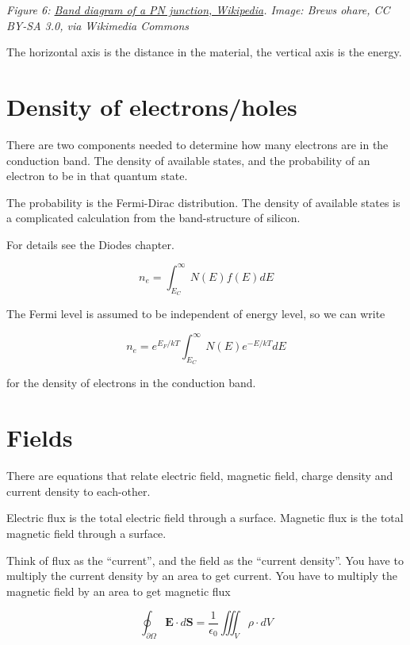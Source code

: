 {
\centering
{}
}

\emph{Figure 6: \href{https://en.wikipedia.org/wiki/Band_diagram}{Band
diagram of a PN junction, Wikipedia}. Image: Brews ohare, CC BY-SA 3.0,
via Wikimedia Commons}

The horizontal axis is the distance in the material, the vertical axis
is the energy.

\section{Density of electrons/holes}\label{density-of-electronsholes}

There are two components needed to determine how many electrons are in
the conduction band. The density of available states, and the
probability of an electron to be in that quantum state.

The probability is the Fermi-Dirac distribution. The density of
available states is a complicated calculation from the band-structure of
silicon.

For details see the Diodes chapter.

\[ n_e = \int_{E_C}^{\infty} N(E)f(E) dE\]

The Fermi level is assumed to be independent of energy level, so we can
write

\[ n_e = e^{E_F/kT}  \int_{E_C}^{\infty} N(E) e^{-E/kT}dE\]

for the density of electrons in the conduction band.

\section{Fields}\label{fields}

There are equations that relate electric field, magnetic field, charge
density and current density to each-other.

Electric flux is the total electric field through a surface. Magnetic
flux is the total magnetic field through a surface.

Think of flux as the ``current'', and the field as the ``current
density''. You have to multiply the current density by an area to get
current. You have to multiply the magnetic field by an area to get
magnetic flux

\[ \oint_{\partial \Omega} \mathbf{E} \cdot d\mathbf{S} = \frac{1}{\epsilon_0} \iiint_{V} \rho
\cdot dV\]

